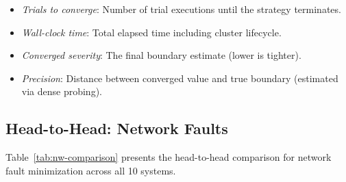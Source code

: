 \begin{itemize}[leftmargin=*,topsep=2pt,itemsep=1pt]
  \item \emph{Trials to converge}: Number of trial executions until the
        strategy terminates.
  \item \emph{Wall-clock time}: Total elapsed time including cluster lifecycle.
  \item \emph{Converged severity}: The final boundary estimate (lower is tighter).
  \item \emph{Precision}: Distance between converged value and true boundary
        (estimated via dense probing).
\end{itemize}

\subsection{Head-to-Head: Network Faults}
\label{sec:head-to-head}

Table~\ref{tab:nw-comparison} presents the head-to-head comparison for
network fault minimization across all 10 systems.

